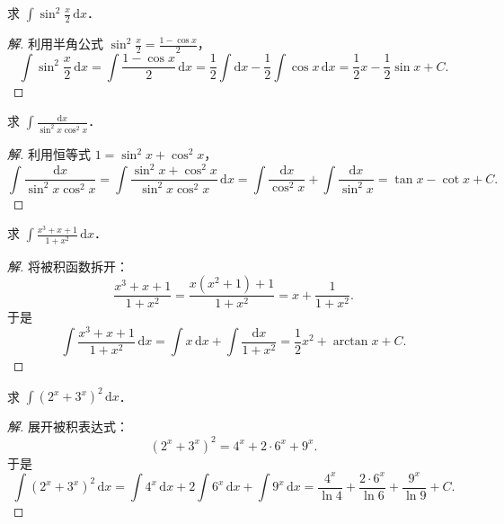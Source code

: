 \begin{example}
求 $\int \sin^2\frac{x}{2}\,\mathrm{d}x$．
\end{example}

\begin{proof}[解]
利用半角公式 $\sin^2\frac{x}{2} = \frac{1 - \cos x}{2}$，
\[
\int \sin^2\frac{x}{2}\,\mathrm{d}x = \int \frac{1 - \cos x}{2}\,\mathrm{d}x = \frac{1}{2}\int \mathrm{d}x - \frac{1}{2}\int \cos x\,\mathrm{d}x = \frac{1}{2}x - \frac{1}{2}\sin x + C.
\]
\end{proof}

\begin{example}
求 $\int \frac{\mathrm{d}x}{\sin^2 x\cos^2 x}$．
\end{example}

\begin{proof}[解]
利用恒等式 $1 = \sin^2 x + \cos^2 x$，
\[
\int \frac{\mathrm{d}x}{\sin^2 x\cos^2 x} = \int \frac{\sin^2 x + \cos^2 x}{\sin^2 x\cos^2 x}\,\mathrm{d}x = \int \frac{\mathrm{d}x}{\cos^2 x} + \int \frac{\mathrm{d}x}{\sin^2 x} = \tan x - \cot x + C.
\]
\end{proof}

\begin{example}
求 $\int \frac{x^3 + x + 1}{1 + x^2}\,\mathrm{d}x$．
\end{example}

\begin{proof}[解]
将被积函数拆开：
\[
\frac{x^3 + x + 1}{1 + x^2} = \frac{x(x^2 + 1) + 1}{1 + x^2} = x + \frac{1}{1 + x^2}.
\]
于是
\[
\int \frac{x^3 + x + 1}{1 + x^2}\,\mathrm{d}x = \int x\,\mathrm{d}x + \int \frac{\mathrm{d}x}{1 + x^2} = \frac{1}{2}x^2 + \arctan x + C.
\]
\end{proof}

\begin{example}
求 $\int (2^x + 3^x)^2\,\mathrm{d}x$．
\end{example}

\begin{proof}[解]
展开被积表达式：
\[
(2^x + 3^x)^2 = 4^x + 2\cdot 6^x + 9^x.
\]
于是
\[
\int (2^x + 3^x)^2\,\mathrm{d}x = \int 4^x\,\mathrm{d}x + 2\int 6^x\,\mathrm{d}x + \int 9^x\,\mathrm{d}x = \frac{4^x}{\ln 4} + \frac{2\cdot 6^x}{\ln 6} + \frac{9^x}{\ln 9} + C.
\]
\end{proof}

